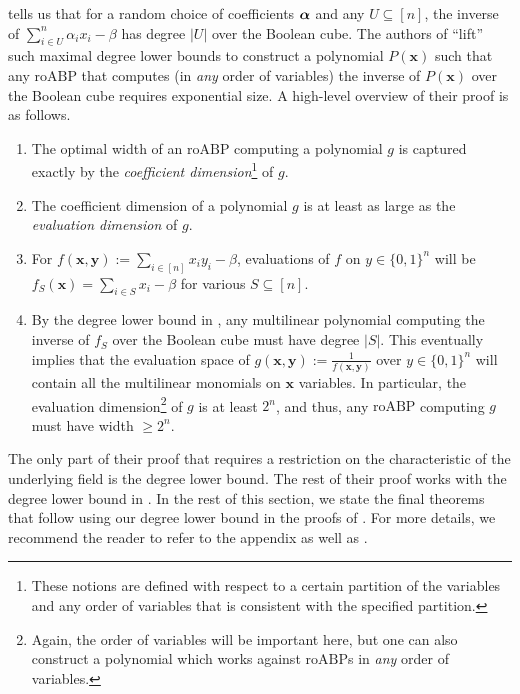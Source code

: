 \documentclass[11pt]{article}
\newcommand{\Boo}{\{0,1 \}}
\newcommand{\roABP}{\mathrm{roABP}}
\begin{document}
  tells us that for a random choice of coefficients $\boldsymbol{\alpha}$ and any $U\subseteq [n]$, the inverse of $\sum_{i\in U}^n \alpha_ix_i - \beta$ has degree $|U|$ over the Boolean cube. The authors of \cite{FSTW21} ``lift'' such maximal degree lower bounds to construct a polynomial $P(\mathbf{x})$ such that any $\roABP$ that computes (in \emph{any} order of variables) the inverse of $P(\mathbf{x})$ over the Boolean cube requires exponential size. A high-level overview of their proof is as follows. 
 \begin{enumerate}
     \item The optimal width of an $\roABP$ computing a polynomial $g$ is captured exactly by the \emph{coefficient dimension}\footnote{These notions are defined with respect to a certain partition of the variables and any order of variables that is consistent with the specified partition.} of $g$. 
     \item The coefficient dimension of a polynomial $g$ is at least as large as the \emph{evaluation dimension} of $g$. 
     \item For $f(\mathbf{x},\mathbf{y}) := \sum_{i\in [n]}x_iy_i - \beta$, evaluations of $f$ on $y\in \Boo^n$ will be $f_S(\mathbf{x}) = \sum_{i\in S} x_i - \beta$ for various $S\subseteq [n]$. 
     \item By the degree lower bound in \cite{FSTW21}, any multilinear polynomial computing the inverse of $f_S$ over the Boolean cube must have degree $|S|$. This eventually implies that the evaluation space of $g(\mathbf{x},\mathbf{y}):= \frac{1}{f(\mathbf{x},\mathbf{y})}$ over $y \in \Boo^n$ will contain all the multilinear monomials on $\mathbf{x}$ variables. In particular, the evaluation dimension\footnote{Again, the order of variables will be important here, but one can also construct a polynomial which works against $\roABP$s in \emph{any} order of variables.} of $g$ is at least $2^n$, and thus, any $\roABP$ computing $g$ must have width $\geq 2^n$.
 \end{enumerate}
 The only part of their proof that requires a restriction on the characteristic of the underlying field is the degree lower bound. The rest of their proof works with the degree lower bound in . In the rest of this section, we state the final theorems that follow using our degree lower bound in the proofs of \cite{FSTW21}. For more details, we recommend the reader to refer to the appendix as well as \cite{FSTW21}. 
\end{document}
